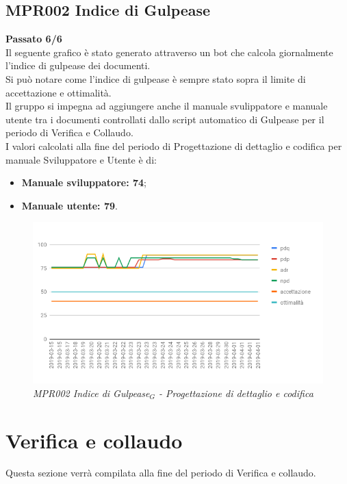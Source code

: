 \subsection{MPR002 Indice di Gulpease}
\textbf{Passato 6/6}\\
Il seguente grafico è stato generato attraverso un bot che calcola giornalmente l'indice di gulpease dei documenti.\\
Si può notare come l'indice di gulpease è sempre stato sopra il limite di accettazione e ottimalità.\\
Il gruppo si impegna ad aggiungere anche il manuale svulippatore e manuale utente tra i documenti controllati dallo script automatico di Gulpease per il periodo di Verifica e Collaudo.\\I valori calcolati alla fine del periodo di Progettazione di dettaglio e codifica per manuale Sviluppatore e Utente è di:
\begin{itemize}
	\item \textbf{Manuale sviluppatore: 74};
	\item \textbf{Manuale utente: 79}.
\end{itemize}
\begin{figure} [H]
    \centering
	\includegraphics[scale=0.5]{./images/gulpeasePDC.png}
    \caption{\textit{MPR002 \textit{Indice di Gulpease$_{G}$} - Progettazione di dettaglio e codifica}}
\end{figure}


\section{Verifica e collaudo}
Questa sezione verrà compilata alla fine del periodo di Verifica e collaudo.